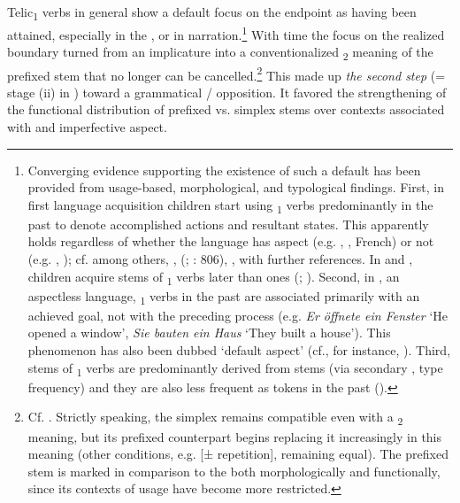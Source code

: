 \documentclass[output=paper]{langsci/langscibook}
\begin{document}
Telic\textsubscript{1} verbs in general show a default focus on the endpoint as having been attained, especially in the , or in narration.\footnote{\label{fn:wiemer:18}Converging evidence supporting the existence of such a default has been provided from usage-based, morphological, and typological findings. First, in first language acquisition children start using \textsubscript{1} verbs predominantly in the past to denote accomplished actions and resultant states. This apparently holds regardless of whether the language has aspect (e.g. , , French) or not (e.g. , ); cf. among others, \citet{Schlyter1990,Lehmann1992}, \citeauthor{Stoll1998} (\citeyear{Stoll1998}; \citeyear{Stoll2005}: 806), \citet{Gagarina2004}, with further references. In  and , children acquire  stems of \textsubscript{1} verbs later than  ones (\citealt{Lehmann1990onto}; \citealt{Gagarina2004}). Second, in , an aspectless language, \textsubscript{1} verbs in the past are associated primarily with an achieved goal, not with the preceding process (e.g. \textit{Er öffnete ein Fenster} ‘He opened a window’, \textit{Sie bauten ein Haus} ‘They built a house’). This phenomenon has also been dubbed ‘default aspect’ (cf., for instance, \citealt{Bohnemeyer2004}). Third,   stems of \textsubscript{1} verbs are predominantly derived from  stems (via secondary , type frequency) and they are also less frequent as tokens in the past (\citealt{Breu1980,Lehmann1993gestuft,Gagarina2004}).}{} With time the focus on the realized boundary turned from an implicature into a conventionalized \textsubscript{2} meaning of the prefixed stem that no longer can be cancelled.\footnote{Cf. \citet[128f.]{Breu1992}. Strictly speaking, the simplex remains compatible even with a \textsubscript{2} meaning, but its prefixed counterpart begins replacing it increasingly in this meaning (other conditions, e.g. [± repetition], remaining equal). The prefixed stem is marked in comparison to the  both morphologically and functionally, since its contexts of usage have become more restricted.} This made up \textit{the second step} (= stage (ii) in ) toward a grammatical / opposition. It favored the strengthening of the functional distribution of prefixed vs. simplex stems over contexts associated with  and imperfective aspect.
\end{document}
